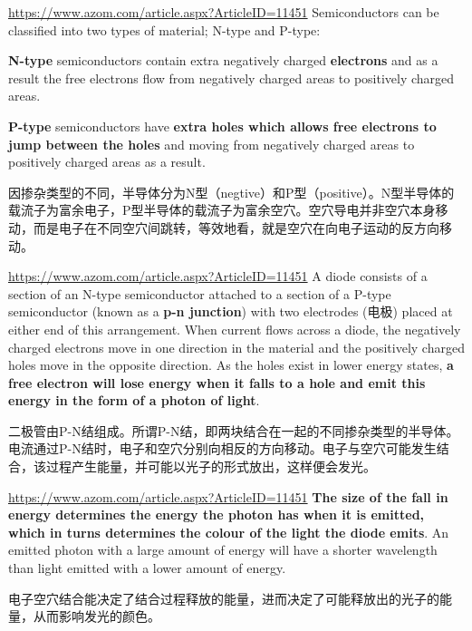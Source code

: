 \documentclass{beamer}
\newenvironment{slide}{
    \begin{frame}{\bfseries{\sectiontitle}}
}{
    \end{frame}
}
\begin{document}
\begin{slide}{\url{https://www.azom.com/article.aspx?ArticleID=11451}}
    Semiconductors can be classified into two types of material; N-type and P-type:
    \medskip

    \textbf{N-type} semiconductors contain extra negatively charged \textbf{electrons} and as a result the free electrons flow from negatively charged areas to positively charged areas.
    \medskip

    \textbf{P-type} semiconductors have \textbf{extra holes which allows free electrons to jump between the holes} and moving from negatively charged areas to positively charged areas as a result.
    \bigskip

    因掺杂类型的不同，半导体分为N型（negtive）和P型（positive）。N型半导体的载流子为富余电子，P型半导体的载流子为富余空穴。空穴导电并非空穴本身移动，而是电子在不同空穴间跳转，等效地看，就是空穴在向电子运动的反方向移动。
\end{slide}

\begin{slide}{\url{https://www.azom.com/article.aspx?ArticleID=11451}}
    A diode consists of a section of an N-type semiconductor attached to a section of a P-type semiconductor (known as a \textbf{p-n junction}) with two electrodes (电极) placed at either end of this arrangement. When current flows across a diode, the negatively charged electrons move in one direction in the material and the positively charged holes move in the opposite direction. As the holes exist in lower energy states, \textbf{a free electron will lose energy when it falls to a hole and emit this energy in the form of a photon of light}.
    \bigskip

    二极管由P-N结组成。所谓P-N结，即两块结合在一起的不同掺杂类型的半导体。电流通过P-N结时，电子和空穴分别向相反的方向移动。电子与空穴可能发生结合，该过程产生能量，并可能以光子的形式放出，这样便会发光。
\end{slide}

\begin{slide}{\url{https://www.azom.com/article.aspx?ArticleID=11451}}
    \textbf{The size of the fall in energy determines the energy the photon has when it is emitted, which in turns determines the colour of the light the diode emits}. An emitted photon with a large amount of energy will have a shorter wavelength than light emitted with a lower amount of energy.
    \bigskip

    电子空穴结合能决定了结合过程释放的能量，进而决定了可能释放出的光子的能量，从而影响发光的颜色。
\end{slide}
\end{document}
